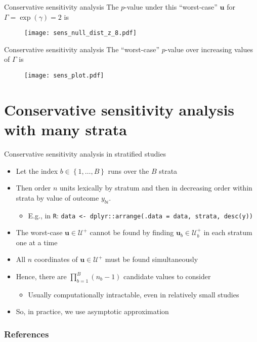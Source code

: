 \documentclass[table, xcolor={dvipsnames}, 9pt]{beamer}
\theoremstyle{newstyle}
\begin{document}
\begin{frame}{Conservative sensitivity analysis}
\vfill
The $p$-value under this ``worst-case'' $\bm{u}$ for $\Gamma = \exp(\gamma) = 2$ is
\vfill
\begin{figure}[H]
\texttt{[image: sens\_null\_dist\_z\_8.pdf]}
\end{figure} \vfill
\end{frame}
\begin{frame}{Conservative sensitivity analysis}
\vfill
The ``worst-case'' $p$-value over increasing values of $\Gamma$ is
\vfill
\begin{figure}[H]
\texttt{[image: sens\_plot.pdf]}
\end{figure} \vfill
\end{frame}
\section{Conservative sensitivity analysis with many strata}
\begin{frame}{Conservative sensitivity analysis in stratified studies}
\vfill
\begin{itemize} \vfill
\item Let the index $b \in \left\{1, \ldots, B\right\}$ runs over the $B$ strata \vfill
\item  Then order $n$ units lexically by stratum and then in decreasing order within strata by value of outcome $y_{bi}$.
\begin{itemize} \vfill
\item  E.g., in \texttt{R}: \texttt{data <- dplyr::arrange(.data = data, strata, desc(y))} \vfill
\end{itemize}	 \vfill
\item  The worst-case $\mathbf{u} \in \mathcal{U}^+$ cannot be found by finding $\mathbf{u}_b \in \mathcal{U}_b^+$ in each stratum one at a time \vfill
\item  All $n$ coordinates of $\mathbf{u} \in \mathcal{U}^+$ must be found simultaneously \vfill
\item  Hence, there are $\prod \limits_{b = 1}^B \left(n_b - 1\right)$ candidate values to consider \vfill
\begin{itemize} \vfill
\item  Usually computationally intractable, even in relatively small studies  \vfill
\end{itemize} \vfill
\item So, in practice, we use asymptotic approximation \\ \citep{gastwirthetal2000,rosenbaum2018} \vfill
\end{itemize} \vfill
\end{frame}
\begin{frame}[allowframebreaks]
\frametitle{References} 
\scriptsize

\end{frame}
\end{document}
